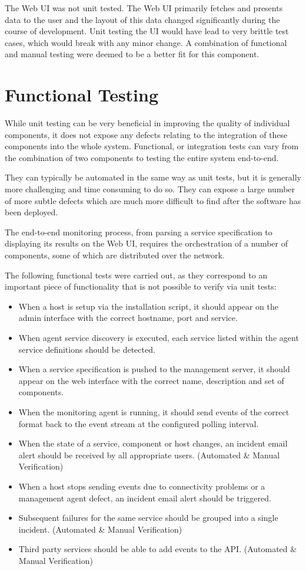 \documentclass{cshonours}
\begin{document}
The Web UI was not unit tested. The Web UI primarily fetches and presents data to the user and the layout of this data changed significantly during the course of development. Unit testing the UI would have lead to very brittle test cases, which would break with any minor change. A combination of functional and manual testing were deemed to be a better fit for this component.

\section{Functional Testing}

While unit testing can be very beneficial in improving the quality of individual components, it does not expose any defects relating to the integration of these components into the whole system. Functional, or integration tests can vary from the combination of two components to testing the entire system end-to-end.

They can typically be automated in the same way as unit tests, but it is generally more challenging and time consuming to do so. They can expose a large number of more subtle defects which are much more difficult to find after the software has been deployed.

The end-to-end monitoring process, from parsing a service specification to displaying its results on the Web UI, requires the orchestration of a number of components, some of which are distributed over the network.

The following functional tests were carried out, as they correspond to an important piece of functionality that is not possible to verify via unit tests:

\begin{itemize}
  \item When a host is setup via the installation script, it should appear on the admin interface with the correct hostname, port and service.
  \item When agent service discovery is executed, each service listed within the agent service definitions should be detected.
  \item When a service specification is pushed to the management server, it should appear on the web interface with the correct name, description and set of components.
  \item When the monitoring agent is running, it should send events of the correct format back to the event stream at the configured polling interval.
  \item When the state of a service, component or host changes, an incident email alert should be received by all appropriate users. (Automated \& Manual Verification)
  \item When a host stops sending events due to connectivity problems or a management agent defect, an incident email alert should be triggered.
  \item Subsequent failures for the same service should be grouped into a single incident. (Automated \& Manual Verification)
  \item Third party services should be able to add events to the API. (Automated \& Manual Verification)
\end{itemize}
\end{document}
